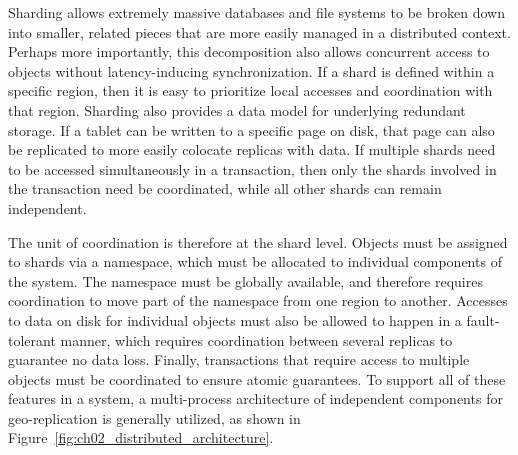 Sharding allows extremely massive databases and file systems to be broken down into smaller, related pieces that are more easily managed in a distributed context.
Perhaps more importantly, this decomposition also allows concurrent access to objects without latency-inducing synchronization.
If a shard is defined within a specific region, then it is easy to prioritize local accesses and coordination with that region.
Sharding also provides a data model for underlying redundant storage.
If a tablet can be written to a specific page on disk, that page can also be replicated to more easily colocate replicas with data.
If multiple shards need to be accessed simultaneously in a transaction, then
only the shards involved in the transaction need be coordinated, while all other shards can remain independent.

The unit of coordination is therefore at the shard level.
Objects must be assigned to shards via a namespace, which must be allocated to individual components of the system.
The namespace must be globally available, and therefore requires coordination to move part of the namespace from one region to another.
Accesses to data on disk for individual objects must also be allowed to happen in a fault-tolerant manner, which requires coordination between several replicas to guarantee no data loss.
Finally, transactions that require access to multiple objects must be coordinated to ensure atomic guarantees.
To support all of these features in a system, a multi-process architecture of independent components for geo-replication is generally utilized, as shown in Figure~\ref{fig:ch02_distributed_architecture}.


